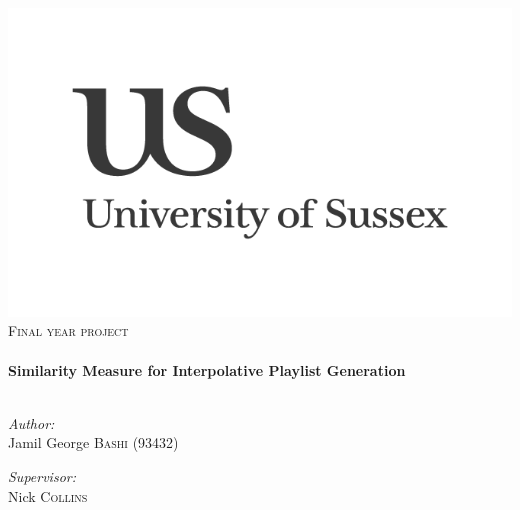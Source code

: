 \begin{titlepage}
\begin{center}
\includegraphics[width=0.5\linewidth]{front/images/us-logo}\\[1cm]

\textsc{\Large Final year project}\\[0.5cm]

\hrulefill \\[0.4cm]
{ \huge \bfseries Similarity Measure for Interpolative Playlist Generation}\\[0.4cm]

\hrulefill \\[1.5cm]
\begin{minipage}{0.4\textwidth}
\begin{flushleft} \large
\emph{Author:}\\
Jamil George \textsc{Bashi} (93432)
\end{flushleft}
\end{minipage}
\begin{minipage}{0.4\textwidth}
\begin{flushright} \large
\emph{Supervisor:} \\
Nick \textsc{Collins}
\end{flushright}
\end{minipage}

\end{center}
\end{titlepage}
